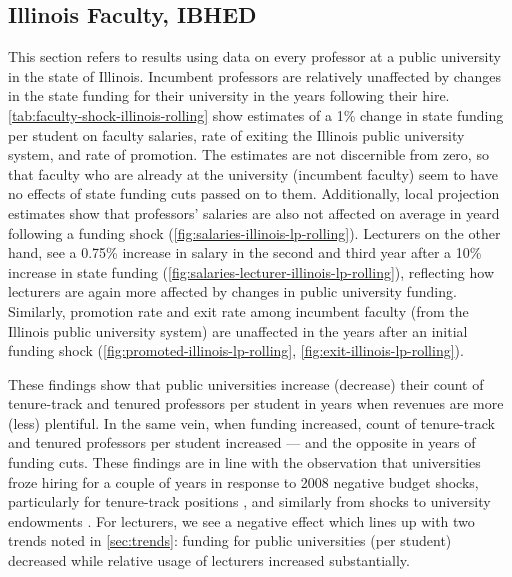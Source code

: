 \subsection{Illinois Faculty, IBHED}
This section refers to results using data on every professor at a public university in the state of Illinois.
Incumbent professors are relatively unaffected by changes in the state funding for their university in the years following their hire.
\autoref{tab:faculty-shock-illinois-rolling} show estimates of a 1\% change in state funding per student on faculty salaries, rate of exiting the Illinois public university system, and rate of promotion.
The estimates are not discernible from zero, so that faculty who are already at the university (incumbent faculty) seem to have no effects of state funding cuts passed on to them.
Additionally, local projection estimates show that professors' salaries are also not affected on average in yeard following a funding shock  (\autoref{fig:salaries-illinois-lp-rolling}).
Lecturers on the other hand, see a 0.75\% increase in salary in the second and third year after a 10\% increase in state funding (\autoref{fig:salaries-lecturer-illinois-lp-rolling}), reflecting how lecturers are again more affected by changes in public university funding.
Similarly, promotion rate and exit rate among incumbent faculty  (from the Illinois public university system) are unaffected in the years after an initial funding shock (\autoref{fig:promoted-illinois-lp-rolling}, \ref{fig:exit-illinois-lp-rolling}).

These findings show that public universities increase (decrease) their count of tenure-track and tenured professors per student in years when revenues are more (less) plentiful.
In the same vein, when funding increased, count of tenure-track and tenured professors per student increased --- and the opposite in years of funding cuts.
These findings are in line with the observation that universities froze hiring for a couple of years in response to 2008 negative budget shocks, particularly for tenure-track positions \citep{turner2014impact}, and similarly from shocks to university endowments \citep{brown2014endowment}.
For lecturers, we see a negative effect which lines up with two trends noted in \autoref{sec:trends}: funding for public universities (per student) decreased while relative usage of lecturers increased substantially.

